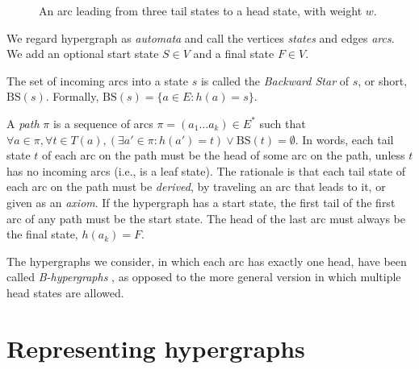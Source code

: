 \documentclass[12pt]{article}
\let\cite\citep    %
\begin{document}
\begin{figure}[t]
  \centering
  \caption{An arc leading from three tail states to a head state,
    with weight $w$.}
  \label{fig:hyperarc}
\end{figure}

We regard hypergraph as \textit{automata} and call the vertices
\textit{states} and edges \textit{arcs}. We add an optional start
state $S\in V$ and a final state $F\in V$.

The set of incoming arcs into a state $s$ is called the
\textit{Backward Star} of $s$, or short, $\mathrm{BS}(s)$. Formally,
$\mathrm{BS}(s) = \{a\in E : h(a) = s\}$.

A \textit{path} $\pi$ is a sequence of arcs $\pi = (a_1 \dots a_k) \in
E^*$ such that $\forall a \in \pi, \forall t \in T(a), (\exists a' \in
\pi : h(a')=t) \lor \mathrm{BS}(t)=\emptyset$. In words, each tail
state $t$ of each arc on the path must be the head of some arc on the
path, unless $t$ has no incoming arcs (i.e., is a leaf state). The
rationale is that each tail state of each arc on the path must be
\textit{derived}, by traveling an arc that leads to it, or given as an
\textit{axiom}.  If the hypergraph has a start state, the first tail
of the first arc of any path must be the start state. The head of the
last arc must always be the final state, $h(a_k)=F$.

The hypergraphs we consider, in which each arc has exactly one head,
have been called \textit{B-hypergraphs} \cite{gallo_directed_1993}, as
opposed to the more general version in which multiple head states are
allowed.

\section{Representing hypergraphs}
\end{document}
